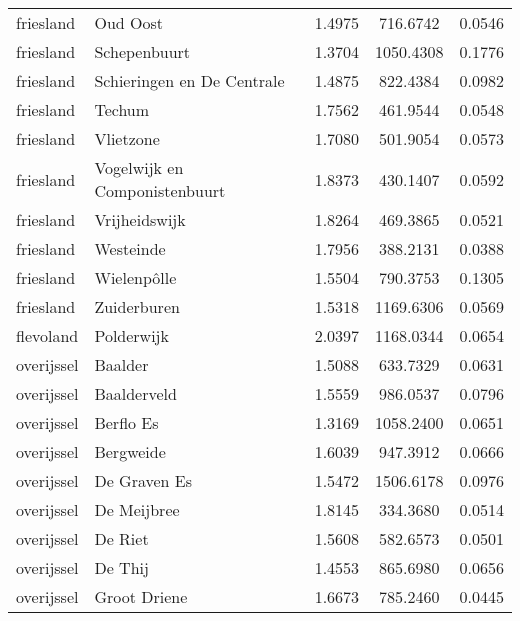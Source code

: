 \begin{longtable}{llccc}
	friesland     & Oud Oost                         & 1.4975  & 716.6742  & 0.0546          \\
	friesland     & Schepenbuurt                     & 1.3704  & 1050.4308 & 0.1776          \\
	friesland     & Schieringen en De Centrale       & 1.4875  & 822.4384  & 0.0982          \\
	friesland     & Techum                           & 1.7562  & 461.9544  & 0.0548          \\
	friesland     & Vlietzone                        & 1.7080  & 501.9054  & 0.0573          \\
	friesland     & Vogelwijk en Componistenbuurt    & 1.8373  & 430.1407  & 0.0592          \\
	friesland     & Vrijheidswijk                    & 1.8264  & 469.3865  & 0.0521          \\
	friesland     & Westeinde                        & 1.7956  & 388.2131  & 0.0388          \\
	friesland     & Wielenpôlle                      & 1.5504  & 790.3753  & 0.1305          \\
	friesland     & Zuiderburen                      & 1.5318  & 1169.6306 & 0.0569          \\
	flevoland     & Polderwijk                       & 2.0397  & 1168.0344 & 0.0654          \\
	overijssel    & Baalder                          & 1.5088  & 633.7329  & 0.0631          \\
	overijssel    & Baalderveld                      & 1.5559  & 986.0537  & 0.0796          \\
	overijssel    & Berflo Es                        & 1.3169  & 1058.2400 & 0.0651          \\
	overijssel    & Bergweide                        & 1.6039  & 947.3912  & 0.0666          \\
	overijssel    & De Graven Es                     & 1.5472  & 1506.6178 & 0.0976          \\
	overijssel    & De Meijbree                      & 1.8145  & 334.3680  & 0.0514          \\
	overijssel    & De Riet                          & 1.5608  & 582.6573  & 0.0501          \\
	overijssel    & De Thij                          & 1.4553  & 865.6980  & 0.0656          \\
	overijssel    & Groot Driene                     & 1.6673  & 785.2460  & 0.0445          \\

\end{longtable}
